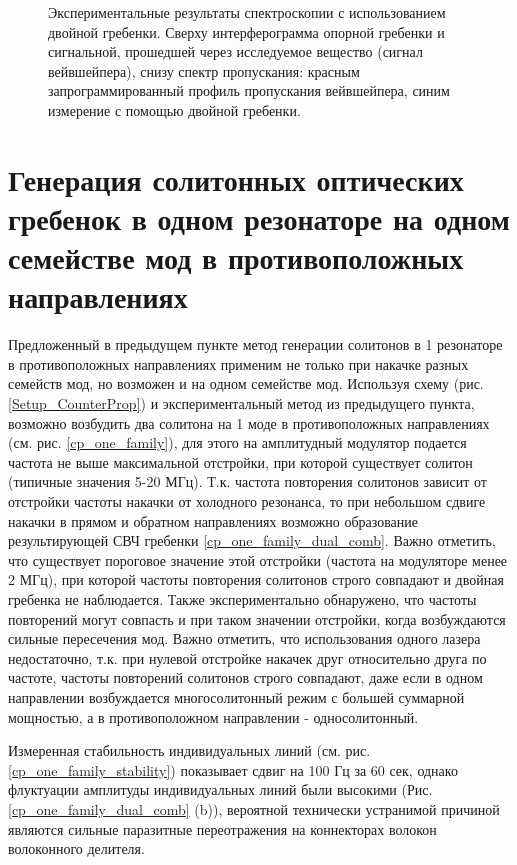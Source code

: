 \begin{figure}[ht]
\begin{minipage}[ht]{1\linewidth}
\end{minipage}
\caption{Экспериментальные результаты спектроскопии с использованием двойной гребенки. Сверху интерферограмма опорной гребенки и сигнальной, прошедшей через исследуемое вещество (сигнал вейвшейпера), снизу спектр пропускания: красным запрограммированный профиль пропускания вейвшейпера, синим измерение с помощью двойной гребенки.}
\label{fig3_spectroscopy}
\end{figure}


\section{Генерация солитонных оптических гребенок в одном резонаторе на одном семействе мод в противоположных направлениях}

Предложенный в предыдущем пункте метод генерации солитонов в 1 резонаторе в противоположных направлениях применим не только при накачке разных семейств мод, но возможен и на одном семействе мод. Используя схему (рис. \ref{Setup_CounterProp}) и экспериментальный метод из предыдущего пункта, возможно возбудить два солитона на 1 моде в противоположных направлениях (см. рис. \ref{cp_one_family}), для этого на амплитудный модулятор подается частота не выше максимальной отстройки, при которой существует солитон (типичные значения 5-20 МГц). Т.к. частота повторения солитонов зависит от отстройки частоты накачки от холодного резонанса, то при небольшом сдвиге накачки в прямом и обратном направлениях возможно образование результирующей СВЧ гребенки \ref{cp_one_family_dual_comb}. Важно отметить, что существует пороговое значение этой отстройки (частота на модуляторе менее 2 МГц), при которой частоты повторения солитонов строго совпадают и двойная гребенка не наблюдается. Также экспериментально обнаружено, что частоты повторений могут совпасть и при таком значении отстройки, когда возбуждаются сильные пересечения мод. Важно отметить, что использования одного лазера недостаточно, т.к. при нулевой отстройке накачек друг относительно друга по частоте, частоты повторений солитонов строго совпадают, даже если в одном направлении возбуждается многосолитонный режим с большей суммарной мощностью, а в противоположном направлении - односолитонный.

Измеренная стабильность индивидуальных линий (см. рис. \ref{cp_one_family_stability}) показывает сдвиг на 100 Гц за 60 сек, однако флуктуации амплитуды индивидуальных линий были высокими (Рис. \ref{cp_one_family_dual_comb} (b)), вероятной технически устранимой причиной являются сильные паразитные переотражения на коннекторах волокон волоконного делителя.

